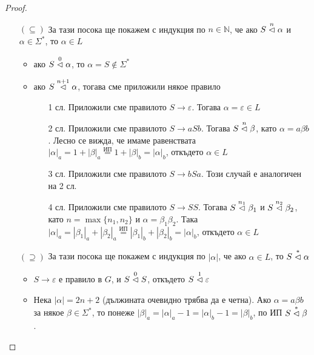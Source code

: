 \begin{proof}
    \begin{itemize}
        \item[$(\subseteq)$] За тази посока ще покажем с индукция по $n \in \mathbb{N}$, че ако $S \stackrel{n}{\vartriangleleft} \alpha$ и $\alpha \in \Sigma^*$, то $\alpha \in L$
            \begin{itemize}
                \item ако $S \stackrel{0}{\vartriangleleft} \alpha$, то $\alpha = S \notin \Sigma^*$ \checkmark
                \item ако $S \stackrel{n + 1}{\vartriangleleft} \alpha$, тогава сме приложили някое правило
                      \begin{itemize}
                          \item[1 сл.] Приложили сме правилото $S \rightarrow \varepsilon$.
                              Тогава $\alpha = \varepsilon \in L$
                          \item[2 сл.] Приложили сме правилото $S \rightarrow aSb$.
                              Тогава $S \stackrel{n}{\vartriangleleft} \beta$, като $\alpha = a \beta b$.
                              Лесно се вижда, че имаме равенствата $|\alpha|_a = 1 + |\beta|_a \stackrel{\text{ИП}}{=} 1 + |\beta|_b = |\alpha|_b$, откъдето $\alpha \in L$
                          \item[3 сл.] Приложили сме правилото $S \rightarrow bSa$.
                              Този случай е аналогичен на 2 сл.
                          \item[4 сл.] Приложили сме правилото $S \rightarrow SS$.
                              Тогава $S \stackrel{n_1}{\vartriangleleft} \beta_1$ и $S \stackrel{n_2}{\vartriangleleft} \beta_2$, като $n = \max \{ n_1, n_2 \}$ и $\alpha = \beta_1 \beta_2$.
                              Така $|\alpha|_a = |\beta_1|_a + |\beta_2|_a \stackrel{\text{ИП}}{=} |\beta_1|_b + |\beta_2|_b = |\alpha|_b$, откъдето $\alpha \in L$
                      \end{itemize}
            \end{itemize}
        \item[$(\supseteq)$]  За тази посока ще покажем с индукция по $|\alpha|$, че ако $\alpha \in L$, то $S \stackrel{*}{\vartriangleleft} \alpha$
            \begin{itemize}
                \item $S \rightarrow \varepsilon$ е правило в $G$, и $S \stackrel{0}{\vartriangleleft} S$, откъдето $S \stackrel{1}{\vartriangleleft} \varepsilon$ \checkmark
                \item Нека $|\alpha| = 2n + 2$ (дължината очевидно трябва да е четна).
                      Ако $\alpha = a \beta b$ за някое $\beta \in \Sigma^*$, то понеже $|\beta|_a = |\alpha|_a - 1 = |\alpha|_b - 1 = |\beta|_b$, по ИП $S \stackrel{*}{\vartriangleleft} \beta$.

\end{itemize}
\end{itemize}
\end{proof}
